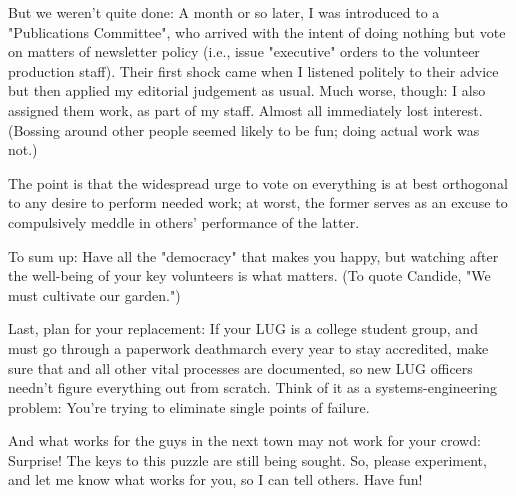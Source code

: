 But we weren't quite done:  A month or so later, I was introduced to a 
"Publications Committee", who arrived with the intent of doing nothing but 
vote on matters of newsletter policy (i.e., issue "executive" orders to the 
volunteer production staff).  Their first shock came when I listened politely 
to their advice but then applied my editorial judgement as usual.  Much 
worse, though:  I also assigned them work, as part of my staff.  Almost 
all immediately lost interest. (Bossing around other people seemed likely 
to be fun; doing actual work was not.)

The point is that the widespread urge to vote on everything is at best
orthogonal to any desire to perform needed work; at worst, the former
serves as an excuse to compulsively meddle in others' performance
of the latter.

To sum up:  Have all the "democracy" that makes you happy, but watching after
the well-being of your key volunteers is what matters.  (To quote Candide, 
"We must cultivate our garden.")

Last, plan for your replacement:  If your LUG is a college student
group, and must go through a paperwork deathmarch every year to stay
accredited, make sure that and all other vital processes are documented,
so new LUG officers needn't figure everything out from scratch.  Think
of it as a systems-engineering problem:  You're trying to eliminate
single points of failure.

And what works for the guys in the next town may not work for your crowd:
Surprise!  The keys to this puzzle are still being sought.  So, please
experiment, and let me know what works for you, so I can tell others.
Have fun!



